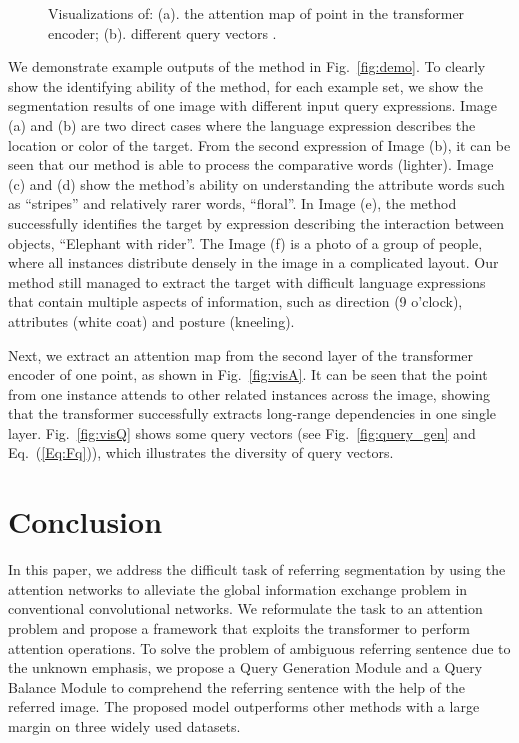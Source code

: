 \documentclass[10pt,twocolumn,letterpaper]{article}
\begin{document}
\begin{figure}[t]
   \centering
   \caption{Visualizations of: (a). the attention map of point  in the transformer encoder; (b). different query vectors .}
   \vspace{-10pt}
\end{figure}

We demonstrate example outputs of the method in Fig.~\ref{fig:demo}. To clearly show the identifying ability of the method, for each example set, we show the segmentation results of one image with different input query expressions. Image (a) and (b) are two direct cases where the language expression describes the location or color of the target. From the second expression of Image (b), it can be seen that our method is able to process the comparative words (lighter). Image (c) and (d) show the method's ability on understanding the attribute words such as ``stripes'' and relatively rarer words, \eg ``floral''. In Image (e), the method successfully identifies the target by expression describing the interaction between objects, \ie ``Elephant with rider''. The Image (f) is a photo of a group of people, where all instances distribute densely in the image in a complicated layout. Our method still managed to extract the target with difficult language expressions that contain multiple aspects of information, such as direction (9 o'clock), attributes (white coat) and posture (kneeling).



Next, we extract an attention map from the second layer of the transformer encoder of one point, as shown in Fig.~\ref{fig:visA}. It can be seen that the point from one instance attends to other related instances across the image, showing that the transformer successfully extracts long-range dependencies in one single layer. Fig.~\ref{fig:visQ} shows some query vectors  (see Fig.~\ref{fig:query_gen} and Eq.~(\ref{Eq:Fq})), which illustrates the diversity of query vectors.

\section{Conclusion}

In this paper, we address the difficult task of referring segmentation by using the attention networks to alleviate the global information exchange problem in conventional convolutional networks. We reformulate the task to an attention problem and propose a framework that exploits the transformer to perform attention operations. To solve the problem of ambiguous referring sentence due to the unknown emphasis, we propose a Query Generation Module and a Query Balance Module to comprehend the referring sentence with the help of the referred image. The proposed model outperforms other methods with a large margin on three widely used datasets.

{\small
    
    
}
\end{document}
